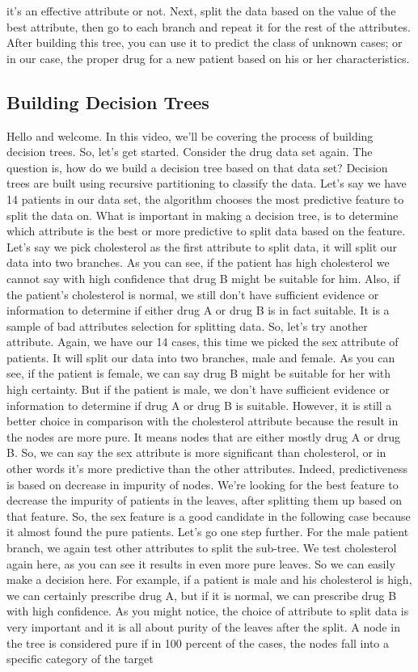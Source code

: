 it's an effective attribute or not. Next, split the data based on the value of the best attribute, then go to each branch and repeat it for the rest of the attributes. After building this tree, you can use it to predict the class of unknown cases; or in our case, the proper drug for a new patient based on his or her characteristics. 
	
	\subsection{Building Decision Trees}
		
	Hello and welcome. In this video, we'll be covering the process of building decision trees. So, let's get started. Consider the drug data set again. The question is, how do we build a decision tree based on that data set? Decision trees are built using recursive partitioning to classify the data. Let's say we have 14 patients in our data set, the algorithm chooses the most predictive feature to split the data on. What is important in making a decision tree, is to determine which attribute is the best or more predictive to split data based on the feature. Let's say we pick cholesterol as the first attribute to split data, it will split our data into two branches. As you can see, if the patient has high cholesterol we cannot say with high confidence that drug B might be suitable for him. Also, if the patient's cholesterol is normal, we still don't have sufficient evidence or information to determine if either drug A or drug B is in fact suitable. It is a sample of bad attributes selection for splitting data. So, let's try another attribute. Again, we have our 14 cases, this time we picked the sex attribute of patients. It will split our data into two branches, male and female. As you can see, if the patient is female, we can say drug B might be suitable for her with high certainty. But if the patient is male, we don't have sufficient evidence or information to determine if drug A or drug B is suitable. However, it is still a better choice in comparison with the cholesterol attribute because the result in the nodes are more pure. It means nodes that are either mostly drug A or drug B. So, we can say the sex attribute is more significant than cholesterol, or in other words it's more predictive than the other attributes. Indeed, predictiveness is based on decrease in impurity of nodes. We're looking for the best feature to decrease the impurity of patients in the leaves, after splitting them up based on that feature. So, the sex feature is a good candidate in the following case because it almost found the pure patients. Let's go one step further. For the male patient branch, we again test other attributes to split the sub-tree. We test cholesterol again here, as you can see it results in even more pure leaves. So we can easily make a decision here. For example, if a patient is male and his cholesterol is high, we can certainly prescribe drug A, but if it is normal, we can prescribe drug B with high confidence. As you might notice, the choice of attribute to split data is very important and it is all about purity of the leaves after the split. A node in the tree is considered pure if in 100 percent of the cases, the nodes fall into a specific category of the target 